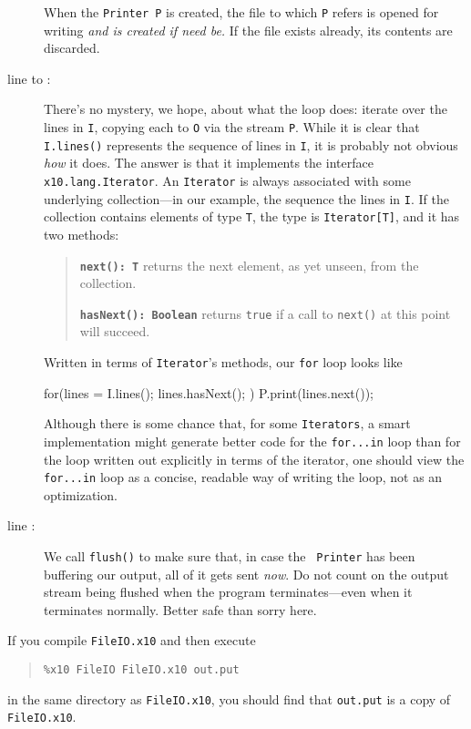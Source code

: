\begin{description}
When the {\tt Printer P} is created, the file to which {\tt P} refers is opened for
writing {\em and is created if need be.}  If the file exists already, its contents are
discarded.
\item[line \xlref{fileio-for}{7} to \xlref{fileio-rof}{9}:]
                                                                           There's no mystery, we hope, about what the loop does: iterate over the lines in {\tt I}, copying each to {\tt O} via the stream 
{\tt P}.  While it is clear that {\tt I.lines()} represents the sequence of lines in
{\tt I}, it is probably not obvious {\em how} it does.  The answer is that it 
implements the interface {\tt x10.lang.Iterator}.
An {\tt Iterator} is always associated with
some underlying collection---in our example, the sequence the lines in {\tt I}.
If the collection contains elements of type {\tt T}, 
the type is {\tt Iterator[T]}, and it has two methods:
\begin{quote}
{\tt {\bf next(): T}} returns the next element, as yet unseen, from the
collection. 

{\tt {\bf hasNext(): Boolean}} returns {\tt true} if a call to {\tt next()} at this
point will succeed.
\end{quote}
Written in terms of {\tt Iterator}'s methods, our {\tt for} loop looks like
\begin{xten}
for(lines = I.lines(); lines.hasNext(); ) {
  P.print(lines.next());
}
\end{xten}
Although there is some chance that, for some {\tt Iterators},
a smart implementation might generate better
code for the {\tt for...in} loop than for the loop written out explicitly
in terms of the iterator,
one should view the {\tt for...in} loop as
a concise, readable way of writing the loop, not as an optimization.
\item[line \xlref{fileio-flush}{10}:] We call {\tt flush()} to make sure that, in case the {\tt
Printer} has been buffering our output, all of it gets sent {\em now}.  Do not
count on the output stream being flushed when the program terminates---even when
it terminates normally. Better safe than sorry here.
\end{description}

If you compile {\tt FileIO.x10} and then execute
\begin{quote}
\begin{verbatim}
%x10 FileIO FileIO.x10 out.put
\end{verbatim}
\end{quote}
in the same directory as {\tt FileIO.x10}, you should find that {\tt out.put}
is a copy of {\tt FileIO.x10}.

